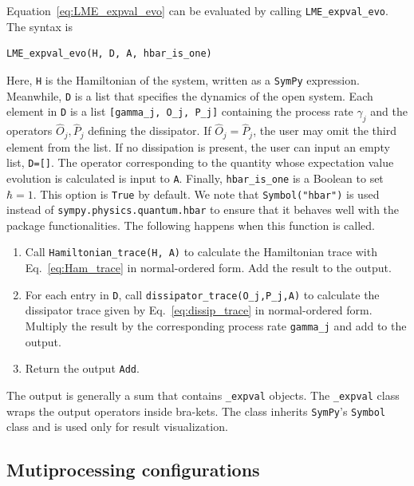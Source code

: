 \documentclass[onecolumn, 12pt, sort&compress]{elsarticle}
\newcommand{\inlinecode}[1]{\texttt{#1}}
\begin{document}
Equation~\eqref{eq:LME_expval_evo} can be evaluated by calling \inlinecode{LME_expval_evo}. The syntax is
\begin{verbatim}
LME_expval_evo(H, D, A, hbar_is_one)
\end{verbatim}
Here, \inlinecode{H} is the Hamiltonian of the system, written as a \texttt{SymPy} expression. Meanwhile, \inlinecode{D} is a list that specifies the dynamics of the open system.  Each element in \inlinecode{D} is a list \inlinecode{[gamma_j, O_j, P_j]} containing the process rate $\gamma_j$ and the operators $\hat{O}_j,\hat{P}_j$ defining the dissipator. If $\hat{O}_j=\hat{P}_j$, the user may omit the third element from the list. If no dissipation is present, the user can input an empty list, \inlinecode{D=[]}. The operator corresponding to the quantity whose expectation value evolution is calculated is input to \inlinecode{A}. Finally, \inlinecode{hbar_is_one} is a Boolean to set $\hbar=1$. This option is \inlinecode{True} by default. We note that \inlinecode{Symbol("hbar")} is used instead of \inlinecode{sympy.physics.quantum.hbar} to ensure that it behaves well with the package functionalities. The following happens when this function is called.
\begin{enumerate}
    \item Call \inlinecode{Hamiltonian_trace(H, A)} to calculate the Hamiltonian trace with Eq.~\eqref{eq:Ham_trace} in normal-ordered form. Add the result to the output.
    \item For each entry in \inlinecode{D}, call \inlinecode{dissipator_trace(O_j,P_j,A)} to calculate the dissipator trace given by Eq.~\eqref{eq:dissip_trace} in normal-ordered form. Multiply the result by the corresponding process rate \inlinecode{gamma_j} and add to the output.
    \item Return the output \inlinecode{Add}. 
\end{enumerate}
The output is generally a sum that contains \inlinecode{_expval} objects. The \inlinecode{_expval} class wraps the output operators inside bra-kets. The class inherits \texttt{SymPy}'s \inlinecode{Symbol} class and is used only for result visualization. 


\subsection{Mutiprocessing configurations}
\end{document}
